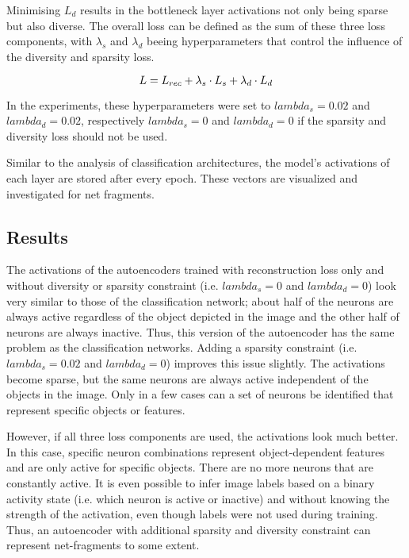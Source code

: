 Minimising $L_{d}$ results in the bottleneck layer activations not only being sparse but also diverse. 
The overall loss can be defined as the sum of these three loss components, with $\lambda_s$ and $\lambda_d$ beeing hyperparameters that control the influence of the diversity and sparsity loss.

\begin{equation}\eqlbl{ae_kldl2}
		L = L_{rec} + \lambda_s \cdot L_{s} + \lambda_d \cdot L_{d}
\end{equation}

In the experiments, these hyperparameters were set to $lambda_s = 0.02$ and $lambda_d = 0.02$, respectively $lambda_s = 0$ and $lambda_d = 0$ if the sparsity and diversity loss should not be used.

Similar to the analysis of classification architectures, the model's activations of each layer are stored after every epoch.
These vectors are visualized and investigated for net fragments.

\subsection{Results}
The activations of the autoencoders trained with reconstruction loss only and without diversity or sparsity constraint (i.e. $lambda_s = 0$ and $lambda_d = 0$) look very similar to those of the classification network; about half of the neurons are always active regardless of the object depicted in the image and the other half of neurons are always inactive. Thus, this version of the autoencoder has the same problem as the classification networks. Adding a sparsity constraint (i.e. $lambda_s = 0.02$ and $lambda_d = 0$) improves this issue slightly. The activations become sparse, but the same neurons are always active independent of the objects in the image. Only in a few cases can a set of neurons be identified that represent specific objects or features.

However, if all three loss components are used, the activations look much better. In this case, specific neuron combinations represent object-dependent features and are only active for specific objects. There are no more neurons that are constantly active. It is even possible to infer image labels based on a binary activity state (i.e. which neuron is active or inactive) and without knowing the strength of the activation, even though labels were not used during training. Thus, an autoencoder with additional sparsity and diversity constraint can represent net-fragments to some extent.


